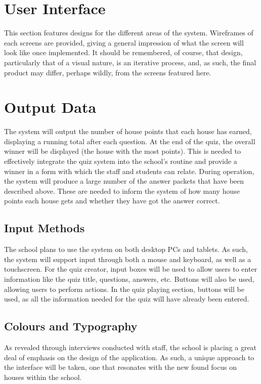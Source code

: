 \section{User Interface}
This section features designs for the different areas of the system. Wireframes of each screens are provided, giving a general impression of what the screen will look like once implemented. It should be remembered, of course, that design, particularly that of a visual nature, is an iterative process, and, as such, the final product may differ, perhaps wildly, from the screens featured here.

\section{Output Data}
The system will output the number of house points that each house has earned, displaying a running total after each question. At the end of the quiz, the overall winner will be displayed (the house with the most points). This is needed to effectively integrate the quiz system into the school's routine and provide a winner in a form with which the staff and students can relate. During operation, the system will produce a large number of the answer packets that have been described above. These are needed to inform the system of how many house points each house gets and whether they have got the answer correct.

\subsection{Input Methods}
The school plans to use the system on both desktop PCs and tablets. As such, the system will support input through both a mouse and keyboard, as well as a touchscreen. For the quiz creator, input boxes will be used to allow users to enter information like the quiz title, questions, answers, etc. Buttons will also be used, allowing users to perform actions. In the quiz playing section, buttons will be used, as all the information needed for the quiz will have already been entered.

\subsection{Colours and Typography}
As revealed through interviews conducted with staff, the school is placing a great deal of emphasis on the design of the application. As such, a unique approach to the interface will be taken, one that resonates with the new found focus on houses within the school.

